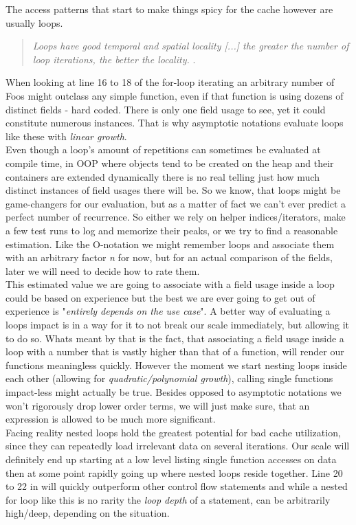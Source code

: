 The access patterns that start to make things spicy for the cache however are usually loops.
\begin{quote}
	\textit{Loops have good temporal and spatial locality [...] the greater the number of loop iterations, the better the locality.} .
\end{quote}
When looking at line 16 to 18 of  the for-loop iterating an arbitrary number of Foos might outclass any simple function, even if that function is using dozens of distinct fields - hard coded. There is only one field usage to see, yet it could constitute numerous instances. That is why asymptotic notations evaluate loops like these with \textit{linear growth}.\\
Even though a loop's amount of repetitions can sometimes be evaluated at compile time, in OOP where objects tend to be created on the heap and their containers are extended dynamically there is no real telling just how much distinct instances of field usages there will be. So we know, that loops might be game-changers for our evaluation, but as a matter of fact we can't ever predict a perfect number of recurrence. So either we rely on helper indices/iterators, make a few test runs to log and memorize their peaks, or we try to find a reasonable estimation. Like the O-notation we might remember loops and associate them with an arbitrary factor \textit{n} for now, but for an actual comparison of the fields, later we will need to decide how to rate them.\\
This estimated value we are going to associate with a field usage inside a loop could be based on experience but the best we are ever going to get out of experience is "\textit{entirely depends on the use case}". A better way of evaluating a loops impact is in a way for it to not break our scale immediately, but allowing it to do so. Whats meant by that is the fact, that associating a field usage inside a loop with a number that is vastly higher than that of a function, will render our functions meaningless quickly. However the moment we start nesting loops inside each other (allowing for \textit{quadratic/polynomial growth}), calling single functions impact-less might actually be true. Besides opposed to asymptotic notations we won't rigorously drop lower order terms, we will just make sure, that an expression is allowed to be much more significant.\\
Facing reality nested loops hold the greatest potential for bad cache utilization, since they can repeatedly load irrelevant data on several iterations. Our scale will definitely end up starting at a low level listing single function accesses on data then at some point rapidly going up where nested loops reside together. Line 20 to 22 in  will quickly outperform other control flow statements and while a nested for loop like this is no rarity the \textit{loop depth} of a statement, can be arbitrarily high/deep, depending on the situation.\\
